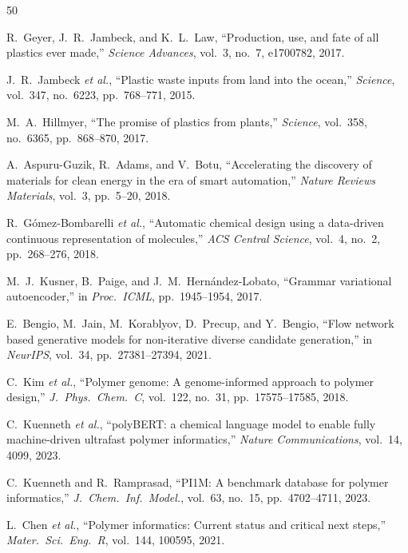 \documentclass[twocolumn,10pt]{article}
\begin{document}
\clearpage
\begin{thebibliography}{50}

R.~Geyer, J.~R.~Jambeck, and K.~L.~Law, ``Production, use, and fate of all plastics ever made,'' \textit{Science Advances}, vol.~3, no.~7, e1700782, 2017.

J.~R.~Jambeck \textit{et al.}, ``Plastic waste inputs from land into the ocean,'' \textit{Science}, vol.~347, no.~6223, pp.~768--771, 2015.

M.~A.~Hillmyer, ``The promise of plastics from plants,'' \textit{Science}, vol.~358, no.~6365, pp.~868--870, 2017.

A.~Aspuru-Guzik, R.~Adams, and V.~Botu, ``Accelerating the discovery of materials for clean energy in the era of smart automation,'' \textit{Nature Reviews Materials}, vol.~3, pp.~5--20, 2018.

R.~G\'{o}mez-Bombarelli \textit{et al.}, ``Automatic chemical design using a data-driven continuous representation of molecules,'' \textit{ACS Central Science}, vol.~4, no.~2, pp.~268--276, 2018.

M.~J.~Kusner, B.~Paige, and J.~M.~Hern\'{a}ndez-Lobato, ``Grammar variational autoencoder,'' in \textit{Proc.\ ICML}, pp.~1945--1954, 2017.

E.~Bengio, M.~Jain, M.~Korablyov, D.~Precup, and Y.~Bengio, ``Flow network based generative models for non-iterative diverse candidate generation,'' in \textit{NeurIPS}, vol.~34, pp.~27381--27394, 2021.

C.~Kim \textit{et al.}, ``Polymer genome: A genome-informed approach to polymer design,'' \textit{J.\ Phys.\ Chem.\ C}, vol.~122, no.~31, pp.~17575--17585, 2018.

C.~Kuenneth \textit{et al.}, ``polyBERT: a chemical language model to enable fully machine-driven ultrafast polymer informatics,'' \textit{Nature Communications}, vol.~14, 4099, 2023.

C.~Kuenneth and R.~Ramprasad, ``PI1M: A benchmark database for polymer informatics,'' \textit{J.\ Chem.\ Inf.\ Model.}, vol.~63, no.~15, pp.~4702--4711, 2023.

L.~Chen \textit{et al.}, ``Polymer informatics: Current status and critical next steps,'' \textit{Mater.\ Sci.\ Eng.\ R}, vol.~144, 100595, 2021.


\end{thebibliography}
\end{document}
